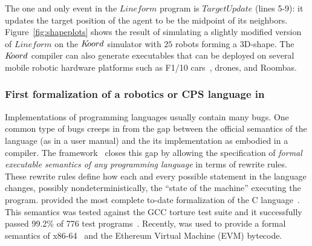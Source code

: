 %
The one and only event in the $\mathit{Lineform}$ program is $\mathit{TargetUpdate}$ (lines 5-9): it updates the target position of the agent  to be the midpoint of its neighbors.  Figure~\ref{fig:shapeplots} shows the result of simulating a slightly modified version of $\mathit{Lineform}$ on the $K\kern-2pt oord$ simulator with $25$ robots forming a 3D-shape. The $K\kern-2pt oord$ compiler can also generate executables that can be deployed on several mobile robotic hardware platforms such as F1/10 cars~\cite{f110}, drones, and Roombas. 
 

%


\subsubsection{First formalization of a robotics or CPS language in \K}
Implementations of programming languages usually contain many bugs. One common type of bugs creeps in from the gap between the official semantics of the language (as in a user manual) and the its implementation as embodied in a compiler. The \K framework~\cite{Kf} closes this gap by allowing the specification of {\em  formal executable semantics of any programming language} in terms of rewrite rules. These rewrite rules define how each and every possible statement in the  language changes, possibly nondeterministically, the ``state of the machine'' executing the program. 
%
\K  provided the most complete to-date formalization  of the C language~\cite{KC}. This semantics was tested against the GCC torture test suite and it successfully passed 99.2\% of 776 test programs~\cite{chuckythesis}. Recently, \K  was used to provide a formal semantics of x86-64~\cite{rusuadvepaper} and the Ethereum Virtual Machine (EVM) bytecode. 


